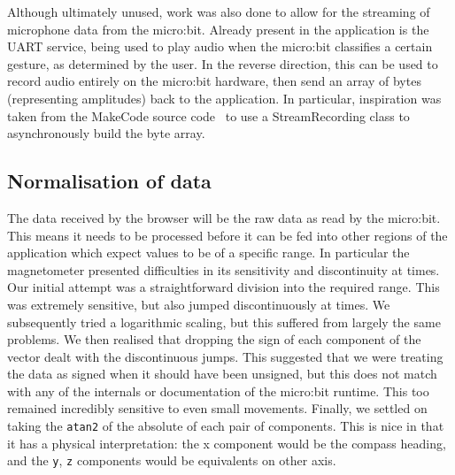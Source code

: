\documentclass{article}
\begin{document}
Although ultimately unused, work was also done to allow for the streaming of microphone data from the micro:bit. Already present in the application is the UART service, being used to play audio when the micro:bit classifies a certain gesture, as determined by the user. In the reverse direction, this can be used to record audio entirely on the micro:bit hardware, then send an array of bytes (representing amplitudes) back to the application. In particular, inspiration was taken from the MakeCode source code~\cite{makecode} to use a StreamRecording class to asynchronously build the byte array.

\subsection{Normalisation of data}%
\label{subsec:datanorm}
The data received by the browser will be the raw data as read by the micro:bit. This means it needs to be processed before it can be fed into other regions of the application which expect values to be of a specific range. In particular the magnetometer presented difficulties in its sensitivity and discontinuity at times. \\

Our initial attempt was a straightforward division into the required range. This was extremely sensitive, but also jumped discontinuously at times. We subsequently tried a logarithmic scaling, but this suffered from largely the same problems. We then realised that dropping the sign of each component of the vector dealt with the discontinuous jumps. This suggested that we were treating the data as signed when it should have been unsigned, but this does not match with any of the internals or documentation of the micro:bit runtime. This too remained incredibly sensitive to even small movements. Finally, we settled on taking the \verb|atan2| of the absolute of each pair of components. This is nice in that it has a physical interpretation: the x component would be the compass heading, and the \verb|y|, \verb|z| components would be equivalents on other axis.
\end{document}
